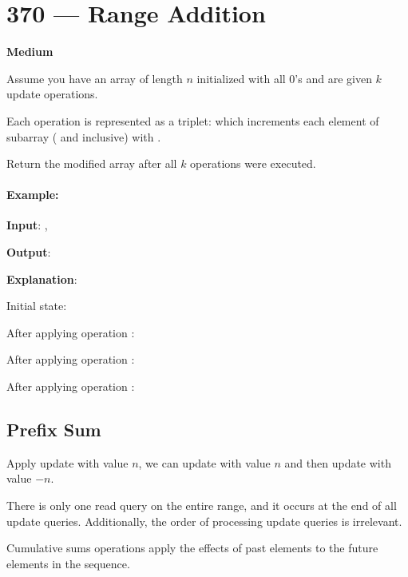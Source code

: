 \section{370 --- Range Addition}

\textbf{Medium}

Assume you have an array of length $n$ initialized with all 0's and are given $k$ update operations.

Each operation is represented as a triplet:  which increments each element of subarray  ( and  inclusive) with .

Return the modified array after all $k$ operations were executed.

\paragraph{Example:}

\begin{flushleft}
\textbf{Input}: , 

\textbf{Output}: \fcj{[-2,0,3,5,3]}

\textbf{Explanation}:

Initial state:

\fcj{[0,0,0,0,0]}

After applying operation \fcj{[1,3,2]}:

\fcj{[0,2,2,2,0]}

After applying operation \fcj{[2,4,3]}:

\fcj{[0,2,5,5,3]}

After applying operation \fcj{[0,2,-2]}:

\fcj{[-2,0,3,5,3]}
\end{flushleft}

\subsection{Prefix Sum}
Apply update  with value $n$, we can update  with value $n$ and then update  with value $-n$.

There is only one read query on the entire range, and it occurs at the end of all update queries. Additionally, the order of processing update queries is irrelevant.

Cumulative sums operations apply the effects of past elements to the future elements in the sequence.

